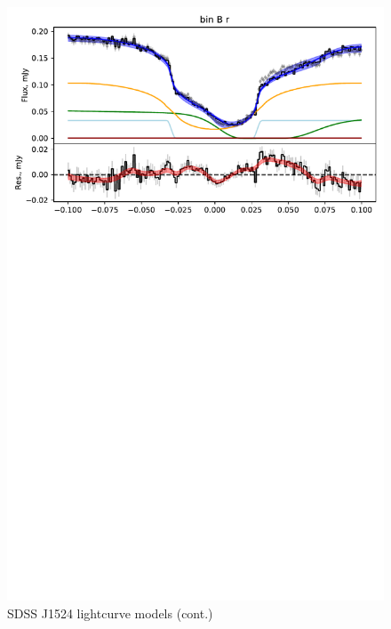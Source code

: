 \begin{figure}
    \centering
    \includegraphics[width=\textwidth]{figures/results/SDSS1524/SDSS1524_4.pdf}
    \caption{SDSS J1524 lightcurve models (cont.)}
    \label{fig:SDSS1524 all lightcurves cont 3}
\end{figure}
